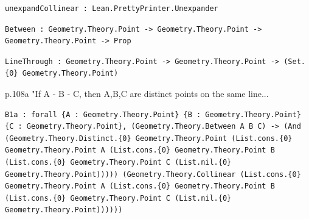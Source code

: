 \begin{definition}
  \label{Geometry.Theory.unexpandCollinear}
  \leanok
\begin{verbatim}unexpandCollinear : Lean.PrettyPrinter.Unexpander\end{verbatim}
\end{definition}

\begin{lemma}
  \label{Geometry.Theory.Between}
  \leanok
\begin{verbatim}Between : Geometry.Theory.Point -> Geometry.Theory.Point -> Geometry.Theory.Point -> Prop\end{verbatim}
\end{lemma}

\begin{definition}
  \label{Geometry.Theory.LineThrough}
  \leanok
\begin{verbatim}LineThrough : Geometry.Theory.Point -> Geometry.Theory.Point -> (Set.{0} Geometry.Theory.Point)\end{verbatim}
\end{definition}

\begin{lemma}
  \label{Geometry.Theory.B1a}
  \leanok
  p.108a "If A - B - C, then A,B,C are distinct points on the same line... 
\begin{verbatim}B1a : forall {A : Geometry.Theory.Point} {B : Geometry.Theory.Point} {C : Geometry.Theory.Point}, (Geometry.Theory.Between A B C) -> (And (Geometry.Theory.Distinct.{0} Geometry.Theory.Point (List.cons.{0} Geometry.Theory.Point A (List.cons.{0} Geometry.Theory.Point B (List.cons.{0} Geometry.Theory.Point C (List.nil.{0} Geometry.Theory.Point))))) (Geometry.Theory.Collinear (List.cons.{0} Geometry.Theory.Point A (List.cons.{0} Geometry.Theory.Point B (List.cons.{0} Geometry.Theory.Point C (List.nil.{0} Geometry.Theory.Point))))))\end{verbatim}
\end{lemma}

